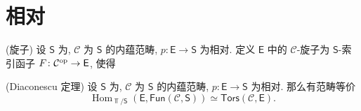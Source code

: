 \chapter{相对\topos{}}

\begin{definition}
	{(旋子)}
	设 $\mathsf S$ 为\topos{}, $\mathcal C$ 为 $\mathsf S$ 的内蕴范畴, $p\colon \mathsf E\to\mathsf S$ 为相对\topos{}. 定义 $\mathsf E$ 中的 $\mathcal C$-旋子为 $\mathsf S$-索引函子 $F\colon \mathcal C^{\text{op}}\to\mathsf E$, 使得
\end{definition}

\begin{prop}
	{(Diaconescu 定理)}
	设 $\mathsf S$ 为\topos{}, $\mathcal C$ 为 $\mathsf S$ 的内蕴范畴, $p\colon \mathsf E\to\mathsf S$ 为相对\topos{}. 那么有范畴等价
	\[
	\operatorname{Hom}_{\Top/\mathsf S}
	(\mathsf E,\mathsf {Fun}(\mathcal C,\mathsf S))
	\simeq \mathsf {Tors}(\mathcal C,\mathsf E).
	\]
\end{prop}